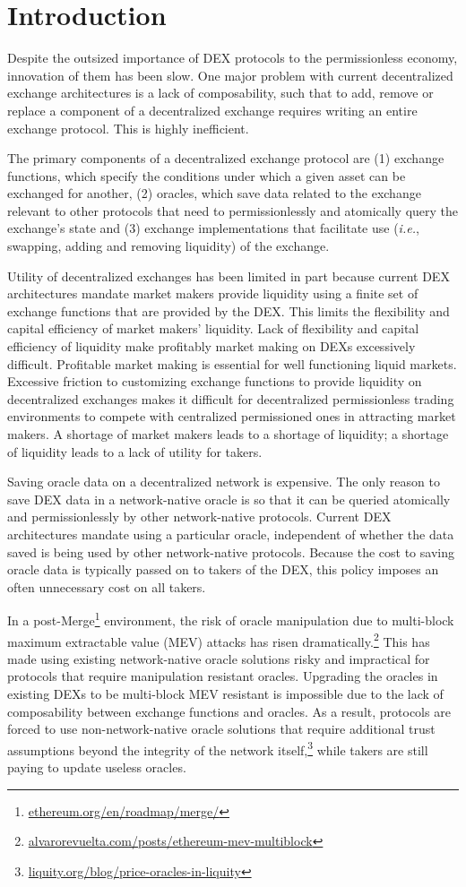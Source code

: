 \documentclass[tikz]{article}
\newcommand{\fref}[1]{\footnote{\href{http://#1}{#1}}}
\begin{document}
\section{Introduction}
Despite the outsized importance of DEX protocols to the permissionless economy, innovation of them has been slow. One major problem with current decentralized exchange architectures is a lack of composability, such that to add, remove or replace a component of a decentralized exchange requires writing an entire exchange protocol. This is highly inefficient.

The primary components of a decentralized exchange protocol are (1) exchange functions, which specify the conditions under which a given asset can be exchanged for another, (2) oracles, which save data related to the exchange relevant to other protocols that need to permissionlessly and atomically query the exchange's state and (3) exchange implementations that facilitate use (\textit{i.e.}, swapping, adding and removing liquidity) of the exchange.

Utility of decentralized exchanges has been limited in part because current DEX architectures mandate market makers provide liquidity using a finite set of exchange functions that are provided by the DEX. This limits the flexibility and capital efficiency of market makers' liquidity. Lack of flexibility and capital efficiency of liquidity make profitably market making on DEXs excessively difficult. Profitable market making is essential for well functioning liquid markets. Excessive friction to customizing exchange functions to provide liquidity on decentralized exchanges makes it difficult for decentralized permissionless trading environments to compete with centralized permissioned ones in attracting market makers. A shortage of market makers leads to a shortage of liquidity; a shortage of liquidity leads to a lack of utility for takers. 

Saving oracle data on a decentralized network is expensive. The only reason to save DEX data in a network-native oracle is so that it can be queried atomically and permissionlessly by other network-native protocols. Current DEX architectures mandate using a particular oracle, independent of whether the data saved is being used by other network-native protocols. Because the cost to saving oracle data is typically passed on to takers of the DEX, this policy imposes an often unnecessary cost on all takers. 

In a post-Merge\fref{ethereum.org/en/roadmap/merge/} environment, the risk of oracle manipulation due to multi-block maximum extractable value (MEV) attacks has risen dramatically.\fref{alvarorevuelta.com/posts/ethereum-mev-multiblock} This has made using existing network-native oracle solutions risky and impractical for protocols that require manipulation resistant oracles. Upgrading the oracles in existing DEXs to be multi-block MEV resistant is impossible due to the lack of composability between exchange functions and oracles. As a result, protocols are forced to use non-network-native oracle solutions that require additional trust assumptions beyond the integrity of the network itself,\fref{liquity.org/blog/price-oracles-in-liquity} while takers are still paying to update useless oracles.
\end{document}

